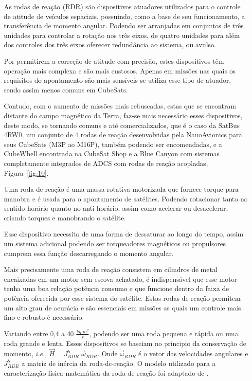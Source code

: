 As rodas de reação (RDR) são dispositivos atuadores utilizados para o controle de atitude de veículos espaciais, possuindo, como a base de seu funcionamento, a transferência de momento angular. Podendo ser arranjadas em conjuntos de três unidades para controlar a rotação nos três eixos, de quatro unidades para além dos controles dos três eixos oferecer redundância ao sistema, ou avulso.

Por permitirem a correção de atitude com precisão, estes dispositivos têm operação mais complexa e são mais custosos. Apenas em missões nas quais os requisitos do apontamento são mais sensíveis se utiliza esse tipo de atuador, sendo assim menos comuns em CubeSats.

Contudo, com o aumento de missões mais rebuscadas, estas que se encontram distante do campo magnético da Terra, faz-se mais necessário esses dispositivos, deste modo, se tornando comuns e até comercializados, que é o caso da SatBus 4RW0, um conjunto de 4 rodas de reação desenvolvidas pela NanoAvionics para seus CubeSats (M3P ao M16P),  também podendo ser encomendadas, e a CubeWhell encontrada na CubeSat Shop e a Blue Canyon com sistemas completamente integrados de ADCS com rodas de reação acopladas,  Figura~\ref{fig:10}.


Uma roda de reação é uma massa rotativa motorizada que fornece torque para manobra e é usada para o apontamento de satélites. Podendo rotacionar tanto no sentido horário quanto no anti-horário, assim como acelerar ou desacelerar, criando torques e manobrando o satélite.

Esse dispositivo necessita de uma forma de dessaturar ao longo do tempo, assim um sistema adicional podendo ser torqueadores magnéticos ou propulsores cumprem essa função descarregando o momento angular.

Mais precisamente uma roda de reação consistem em cilindros de metal encaixadas em um motor sem escova achatado, é indispensável que esse motor tenha uma boa relação potência consumo e que funcione dentro da faixa de potência oferecida por esse sistema do satélite. Estas rodas de reação permitem um alto grau de acurácia e são essenciais em missões as quais um controle mais fino e robusto é necessário.

Variando entre 0,4 a 40 $\frac{kg\;m^2}{s}$, podendo ser uma roda pequena e rápida ou uma roda grande e lenta. Esses dispositivos se baseiam no principio da conservação de momento, \textit{i.e.}, $\vec{H}=J^b_{RDR}\;\vec{\omega}_{RDR}$. Onde $\vec{\omega}_{RDR}$ é o vetor das velocidades angulares e $J^b_{RDR}$ a matriz de inércia da roda-de-reação. O modelo utilizado para a caracterização física-matemática da roda de reação foi adaptado de \cite[p.~270-271]{wertz2012spacecraft}.

